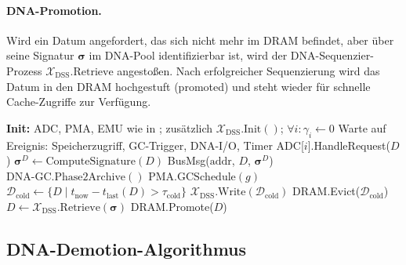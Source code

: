 ﻿\documentclass[a4paper,12pt]{article}
\theoremstyle{definition}
\begin{document}
\paragraph{DNA-Promotion.}
Wird ein Datum angefordert, das sich nicht mehr im DRAM befindet, aber über seine Signatur $\boldsymbol{\sigma}$ im DNA-Pool identifizierbar ist, wird der DNA-Sequenzier-Prozess $\mathcal{X}_{\mathrm{DSS}}.\mathrm{Retrieve}$ angestoßen. Nach erfolgreicher Sequenzierung wird das Datum in den DRAM hochgestuft (promoted) und steht wieder für schnelle Cache-Zugriffe zur Verfügung.

\begin{algorithm}[H]
  \caption{PYMDNA-8 Unified Controller -- Hauptschleife}
  \label{alg:pymdna8_main}
  \begin{algorithmic}[1]
    \State \textbf{Init:} ADC, PMA, EMU wie in \cite{epp2026pymca8};
      zusätzlich $\mathcal{X}_{\mathrm{DSS}}.\mathrm{Init}()$;
      $\forall i: \gamma_i \gets 0$
    \Repeat
      \State Warte auf Ereignis: Speicherzugriff, GC-Trigger, DNA-I/O, Timer
        \State ADC[$i$].HandleRequest($D$) 
        \State $\boldsymbol{\sigma}^D \gets \mathrm{ComputeSignature}(D)$
        \State BusMsg($\mathrm{addr}$, $D$, $\boldsymbol{\sigma}^D$)
      \EndIf
          \State $\mathrm{DNA\text{-}GC}.\mathrm{Phase2Archive}()$
        \EndIf
        \State $\mathrm{PMA}.\mathrm{GCSchedule}(g)$
      \EndIf
        \State $\mathcal{D}_{\mathrm{cold}} \gets \{D \mid t_{\mathrm{now}} - t_{\mathrm{last}}(D) > \tau_{\mathrm{cold}}\}$
        \State $\mathcal{X}_{\mathrm{DSS}}.\mathrm{Write}(\mathcal{D}_{\mathrm{cold}})$
        \State DRAM.Evict($\mathcal{D}_{\mathrm{cold}}$)
      \EndIf
        \State $D \gets \mathcal{X}_{\mathrm{DSS}}.\mathrm{Retrieve}(\boldsymbol{\sigma})$
        \State DRAM.Promote($D$) 
      \EndIf
  \end{algorithmic}
\end{algorithm}

\subsection{DNA-Demotion-Algorithmus}
\end{document}
